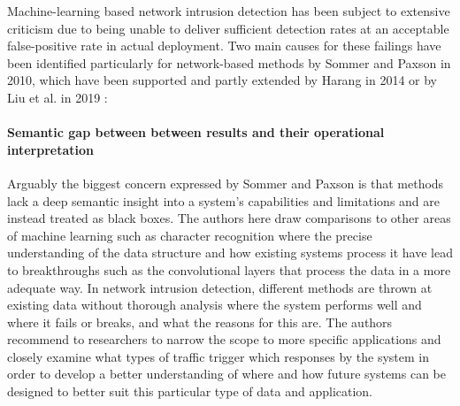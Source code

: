 \documentclass[conference]{IEEEtran}
\begin{document}





Machine-learning based network intrusion detection has been subject to extensive criticism due to being unable to deliver sufficient detection rates at an acceptable false-positive rate in actual deployment. Two main causes for these failings have been identified particularly for network-based methods by Sommer and Paxson \cite{sommer2010outside} in 2010, which have been supported and partly extended by Harang \cite{harang2014bridging} in 2014 or by Liu et al. in 2019 \cite{liu2019machine}:


\paragraph{Semantic gap between between results and their operational interpretation}

Arguably the biggest concern expressed by Sommer and Paxson is that methods lack a deep semantic insight into a system's capabilities and limitations and are instead treated as black boxes. The authors here draw comparisons to other areas of machine learning such as character recognition where the precise understanding of the data structure and how existing systems process it have lead to breakthroughs such as the convolutional layers that process the data in a more adequate way. In network intrusion detection, different methods are thrown at existing data without thorough analysis where the system performs well and where it fails or breaks, and what the reasons for this are. The authors recommend to researchers to narrow the scope to more specific applications and closely examine what types of traffic trigger which responses by the system in order to develop a better understanding of where and how future systems can be designed to better suit this particular type of data and application. 
\end{document}
